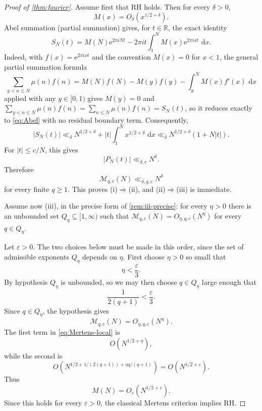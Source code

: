 \documentclass[10pt,a4paper]{amsart}
\newcommand{\Mcal}{\mathcal M}
\newcommand{\dd}{\,\mathrm d}
\newcommand{\e}{\mathrm e}
\begin{document}
\begin{proof}[Proof of \cref{thm:fourier}]
Assume first that RH holds.  Then for every \(\delta>0\),
\[
 M(x)=O_\delta(x^{1/2+\delta}).
\]
Abel summation (partial summation) gives, for \(t\in\mathbb R\), the
exact identity
\begin{equation}\label{eq:Abel}
 S_N(t)
 =
 M(N)\e^{2\pi iNt}
 -
 2\pi it\int_1^N M(x)\e^{2\pi ixt}\,\dd x.
\end{equation}
Indeed, with \(f(x)=\e^{2\pi ixt}\) and the convention \(M(x)=0\) for
\(x<1\), the general partial summation formula
\[
 \sum_{y<n\leq N}\mu(n)f(n)
 =
 M(N)f(N)-M(y)f(y)-\int_y^N M(x)f'(x)\,\dd x
\]
applied with any \(y\in[0,1)\) gives \(M(y)=0\) and
\(\sum_{y<n\leq N}\mu(n)f(n)=\sum_{n\leq N}\mu(n)f(n)=S_N(t)\), so it
reduces exactly to \eqref{eq:Abel} with no residual boundary term.
Consequently,
\[
 |S_N(t)|
 \ll_\delta
 N^{1/2+\delta}
 +
 |t|\int_1^N x^{1/2+\delta}\,\dd x
 \ll_\delta
 N^{1/2+\delta}(1+N|t|).
\]
For \(|t|\leq c/N\), this gives
\[
 |P_N(t)|\ll_{\delta,c}N^\delta.
\]
Therefore
\[
 \Mcal_{q,c}(N)\ll_{\delta,q,c}N^\delta
\]
for every finite \(q\geq1\).  This proves
\textup{(i)}\(\Rightarrow\)\textup{(ii)}, and
\textup{(ii)}\(\Rightarrow\)\textup{(iii)} is immediate.

Assume now \textup{(iii)}, in the precise form of \cref{rem:iii-precise}:
for every \(\eta>0\) there is an unbounded set \(Q_\eta\subseteq[1,\infty)\)
such that \(\Mcal_{q,c}(N)=O_{\eta,q,c}(N^\eta)\) for every
\(q\in Q_\eta\).

Let \(\varepsilon>0\).  The two choices below must be made in this
order, since the set of admissible exponents \(Q_\eta\) depends on
\(\eta\).  First choose \(\eta>0\) so small that
\[
 \eta<\frac{\varepsilon}{3}.
\]
By hypothesis \(Q_\eta\) is unbounded, so we may then choose
\(q\in Q_\eta\) large enough that
\[
 \frac1{2(q+1)}<\frac{\varepsilon}{3}.
\]
Since \(q\in Q_\eta\), the hypothesis gives
\[
 \Mcal_{q,c}(N)=O_{\eta,q,c}(N^\eta).
\]
The first term in \eqref{eq:Mertens-local} is
\[
 O(N^{1/2+\eta}),
\]
while the second is
\[
 O\left(
 N^{1/2+1/(2(q+1))+\eta q/(q+1)}
 \right)
 =
 O(N^{1/2+\varepsilon}).
\]
Thus
\[
 M(N)=O_\varepsilon(N^{1/2+\varepsilon}).
\]
Since this holds for every \(\varepsilon>0\), the classical Mertens
criterion implies RH.
\end{proof}
\end{document}
